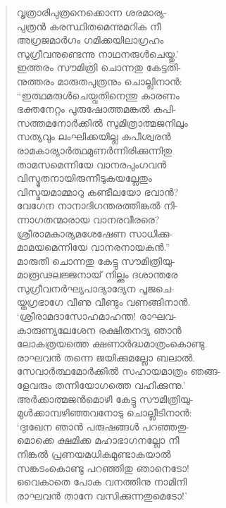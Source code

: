 \begin{verse}
വൃത്രാരിപുത്രനെക്കൊന്ന ശരമാര്യ-\\
പുത്രന്‍ കരസ്ഥിതമെന്നുമറിക നീ\\
അഗ്രജമാര്‍ഗം ഗമിക്കയിലാഗ്രഹം\\
സുഗ്രീവനുണ്ടെന്നു നാഥനരുള്‍ചെയ്തു.’\\
ഇത്തരം സൗമിത്രി ചൊന്നതു കേട്ടതി-\\
നുത്തരം മാരുതപുത്രനും ചൊല്ലിനാന്‍:\\
“ഇത്ഥമരുള്‍ചെയ്വതിനെന്തു കാരണം\\
ഭക്തനേറ്റം പുരുഷോത്തമങ്കല്‍ കപി-\\
സത്തമനോര്‍ക്കില്‍ സുമിത്രാത്മജനിലും\\
സത്യവും ലംഘിക്കയില്ല കപീശ്വരന്‍\\
രാമകാര്യാര്‍ത്ഥമുണര്‍ന്നിരിക്കുന്നിതു\\
താമസമെന്നിയേ വാനരപുംഗവന്‍\\
വിസ്മൃതനായിരുന്നീടുകയല്ലേതും\\
വിസ്മയമാമ്മാറു കണ്ടീലയോ ഭവാന്‍?\\
വേഗേന നാനാദിഗന്തരത്തിങ്കല്‍ നി-\\
ന്നാഗതന്മാരായ വാനരവീരരെ?\\
ശ്രീരാമകാര്യമശേഷേണ സാധിക്കു-\\
മാമയമെന്നിയേ വാനരനായകന്‍.”\\
മാരുതി ചൊന്നതു കേട്ടു സൗമിത്രിയു-\\
മാരൂഢലജ്ജനായ് നില്ക്കും ദശാന്തരേ\\
സുഗ്രീവനര്‍ഘ്യപാദ്യാദ്യേന പൂജചെ-\\
യ്തഗ്രഭാഗേ വീണു വീണ്ടും വണങ്ങിനാന്‍.\\
‘ശ്രീരാമദാസോഹമാഹന്ത! രാഘവ-\\
കാരുണ്യലേശേന രക്ഷിതനദ്യ ഞാന്‍\\
ലോകത്രയത്തെ ക്ഷണാര്‍ദ്ധമാത്രംകൊണ്ടു\\
രാഘവന്‍ തന്നെ ജയിക്കുമല്ലോ ബലാല്‍.\\
സേവാര്‍ത്ഥമോര്‍ക്കില്‍ സഹായമാത്രം ഞങ്ങ-\\
ളേവരും തന്നിയോഗത്തെ വഹിക്കുന്നു.’\\
അര്‍ക്കാത്മജന്‍മൊഴി കേട്ടു സൗമിത്രിയു-\\
മുള്‍ക്കാമ്പഴിഞ്ഞവനോടു ചൊല്ലീടിനാന്‍:\\
‘ദുഃഖേന ഞാന്‍ പരുഷങ്ങള്‍ പറഞ്ഞതു-\\
മൊക്കെ ക്ഷമിക്ക മഹാഭാഗനല്ലോ നീ\\
നിങ്കല്‍ പ്രണയമധികമുണ്ടാകയാല്‍\\
സങ്കടംകൊണ്ടു പറഞ്ഞിതു ഞാനെടോ!\\
വൈകാതെ പോക വനത്തിനു നാമിനി\\
രാഘവന്‍ താനേ വസിക്കുന്നതുമെടോ!’
\end{verse}

